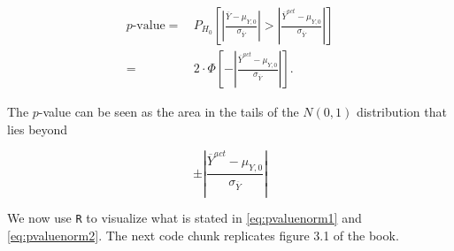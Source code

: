 \documentclass[]{book}
\theoremstyle{definition}
\theoremstyle{definition}
\theoremstyle{definition}
\theoremstyle{remark}
\begin{document}
\begin{align}
p \text{-value} =& \, P_{H_0}\left[ \left\lvert \frac{\overline{Y} - \mu_{Y,0}}{\sigma_{\overline{Y}}} \right\rvert > \left\lvert \frac{\overline{Y}^{act} - \mu_{Y,0}}{\sigma_{\overline{Y}}} \right\rvert \right] \\
=& \, 2 \cdot \Phi \left[ - \left\lvert \frac{\overline{Y}^{act} - \mu_{Y,0}}{\sigma_{\overline{Y}}}  \right\rvert\right].  \label{eq:pvaluenorm1}
\end{align}

The \(p\)-value can be seen as the area in the tails of the \(N(0,1)\)
distribution that lies beyond

\begin{equation}
\pm \left\lvert \frac{\overline{Y}^{act} - \mu_{Y,0}}{\sigma_{\overline{Y}}} \right\rvert \label{eq:pvaluenorm2}
\end{equation}

We now use \texttt{R} to visualize what is stated in
\eqref{eq:pvaluenorm1} and \eqref{eq:pvaluenorm2}. The next code chunk
replicates figure 3.1 of the book.
\end{document}
